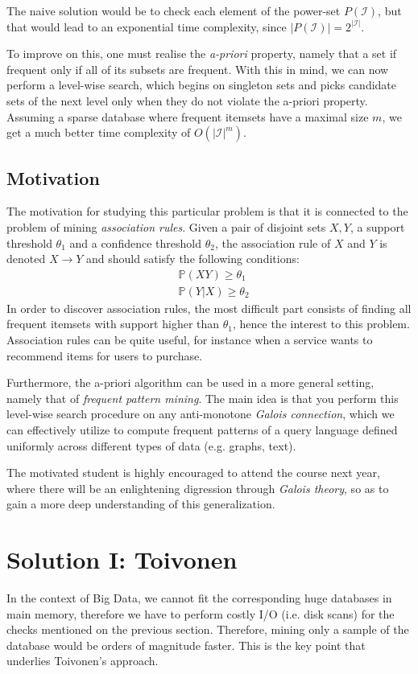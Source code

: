 \documentclass[11pt]{sigplanconf}
\renewcommand\it{\textit}
\newcommand\I{\mathcal{I}}
\renewcommand\P{\mathds{P}}
\begin{document}
The naive solution would be to check each element of the power-set $P(\I)$, but that would lead to an exponential time complexity, since $|P(\I)| = 2^{|\I|}$.

To improve on this, one must realise the \it{a-priori} property, namely that a set if frequent only if all of its subsets are frequent. With this in mind, we can now perform a level-wise search, which begins on singleton sets and picks candidate sets of the next level only when they do not violate the a-priori property. Assuming a sparse database where frequent itemsets have a maximal size $m$, we get a much better time complexity of $O(|\I|^m)$.

\subsection{Motivation}
The motivation for studying this particular problem is that it is connected to the problem of mining \it{association rules}. Given a pair of disjoint sets $X, Y$, a support threshold $\theta_1$ and a confidence threshold $\theta_2$, the association rule of $X$ and $Y$ is denoted $X \rightarrow Y$ and should satisfy the following conditions:
\begin{align*}
&\P(XY) \geq \theta_1 \\
&\P(Y|X) \geq \theta_2
\end{align*}
In order to discover association rules, the most difficult part consists of finding all frequent itemsets with support higher than $\theta_1$, hence the interest to this problem. Association rules can be quite useful, for instance when a service wants to recommend items for users to purchase.

Furthermore, the a-priori algorithm can be used in a more general setting, namely that of \it{frequent pattern mining}. The main idea is that you perform this level-wise search procedure on any anti-monotone \it{Galois connection}, which we can effectively utilize to compute frequent patterns of a query language defined uniformly across different types of data (e.g. graphs, text).

The motivated student is highly encouraged to attend the course next year, where there will be an enlightening digression through \textit{Galois theory}, so as to gain a more deep understanding of this generalization.

\section{Solution I: Toivonen}
In the context of Big Data, we cannot fit the corresponding huge databases in main memory, therefore we have to perform costly I/O (i.e. disk scans) for the checks mentioned on the previous section. Therefore, mining only a sample of the database would be orders of magnitude faster. This is the key point that underlies Toivonen's approach.
\end{document}
